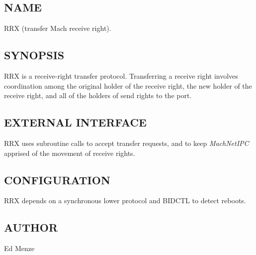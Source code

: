 %
%
%
%
%
%

\subsection*{NAME}

\noindent RRX (transfer Mach receive right).


\subsection*{SYNOPSIS}

RRX is a receive-right transfer protocol.  Transferring a receive
right involves coordination among the original holder of the receive
right, the new holder of the receive right, and all of the holders of
send rights to the port.

\noindent
\subsection*{EXTERNAL INTERFACE}

RRX uses subroutine calls to accept transfer requests, and to keep
{\em MachNetIPC} apprised of the movement of receive rights.

\subsection*{CONFIGURATION}

RRX depends on a synchronous lower protocol and BIDCTL to detect
reboots.


\subsection*{AUTHOR}

\noindent Ed Menze

